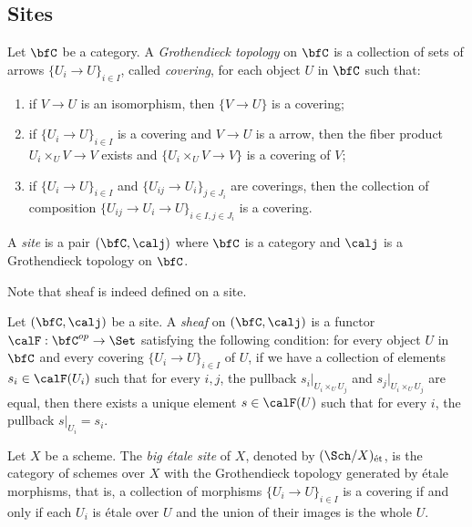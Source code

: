 \subsection{Sites}

    \begin{definition}%
        Let \(\bfC\) be a category.
        A \emph{Grothendieck topology} on \(\bfC\) is a collection of sets of arrows \(\{U_i \to U\}_{i \in I}\), called \emph{covering}, for each object \(U\) in \(\bfC\) such that:
        \begin{enumerate}
            \item if \(V \to U\) is an isomorphism, then \(\{V \to U\}\) is a covering;
            \item if \(\{U_i \to U\}_{i \in I}\) is a covering and \(V \to U\) is a arrow, then the fiber product \(U_i \times_U V \to V\) exists and \(\{U_i \times_U V \to V\}\) is a covering of \(V\);
            \item if \(\{U_i \to U\}_{i \in I}\) and \(\{U_{ij} \to U_{i}\}_{j \in J_i}\) are coverings, then the collection of composition \(\{U_{ij} \to U_i \to U\}_{i\in I, j\in J_i}\) is a covering.
        \end{enumerate}
        A \emph{site} is a pair \((\bfC, \calj)\) where \(\bfC\) is a category and \(\calj\) is a Grothendieck topology on \(\bfC\).
    \end{definition}

    Note that sheaf is indeed defined on a site.

    \begin{definition}%
        Let \((\bfC, \calj)\) be a site.
        A \emph{sheaf} on \((\bfC, \calj)\) is a functor \(\calF: \bfC^{op} \to \Set\) satisfying the following condition:
        for every object \(U\) in \(\bfC\) and every covering \(\{U_i \to U\}_{i \in I}\) of \(U\), 
        if we have a collection of elements \(s_i \in \calF(U_i)\) such that for every \(i,j\), 
        the pullback \(s_i|_{U_i \times_U U_j}\) and \(s_j|_{U_i \times_U U_j}\) are equal, 
        then there exists a unique element \(s \in \calF(U)\) such that for every \(i\), the pullback \(s|_{U_i} = s_i\).
    \end{definition}

    \begin{definition}%
        Let \(X\) be a scheme.
        The \emph{big \'etale site} of \(X\), denoted by \((\Sch/X)_{\text{\'et}}\), is the category of schemes over \(X\) with the Grothendieck topology generated by \'etale morphisms,
        that is, a collection of morphisms \(\{U_i \to U\}_{i \in I}\) is a covering if and only if each \(U_i\) is \'etale over \(U\) and the union of their images is the whole \(U\).
    \end{definition}

